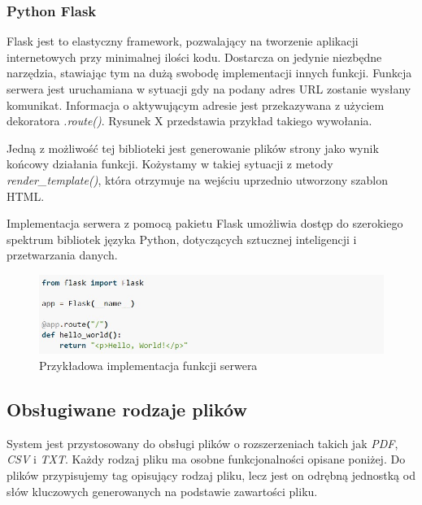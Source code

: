 \documentclass[12pt,a4paper,twoside]{article}
\begin{document}
\subsubsection{Python Flask}
Flask jest to elastyczny framework, pozwalający na tworzenie aplikacji internetowych przy minimalnej ilości kodu. Dostarcza on jedynie niezbędne narzędzia, stawiając tym na dużą swobodę implementacji innych funkcji. 
Funkcja serwera jest uruchamiana w sytuacji gdy na podany adres URL zostanie wysłany komunikat. Informacja o aktywującym adresie jest przekazywana z użyciem dekoratora \textit{.route()}. Rysunek X przedstawia przykład takiego wywołania.\par
Jedną z możliwość tej biblioteki jest generowanie plików strony jako wynik końcowy działania funkcji. Kożystamy w takiej sytuacji z metody \textit{render\_template()}, która otrzymuje na wejściu uprzednio utworzony szablon HTML.\par 
Implementacja serwera z pomocą pakietu Flask umożliwia dostęp do szerokiego spektrum bibliotek języka Python, dotyczących sztucznej inteligencji i przetwarzania danych. 
\begin{figure}[h!]
\centering
  \includegraphics[width=\textwidth]{img/flask.jpg}
  \caption{Przykładowa implementacja funkcji serwera}
\end{figure}
\subsection{Obsługiwane rodzaje plików}
System jest przystosowany do obsługi plików o rozszerzeniach takich jak \textit{PDF}, \textit{CSV} i \textit{TXT}. Każdy rodzaj pliku ma osobne funkcjonalności opisane poniżej. Do plików przypisujemy tag opisujący rodzaj pliku, lecz jest on odrębną jednostką od słów kluczowych generowanych na podstawie zawartości pliku.
\end{document}
